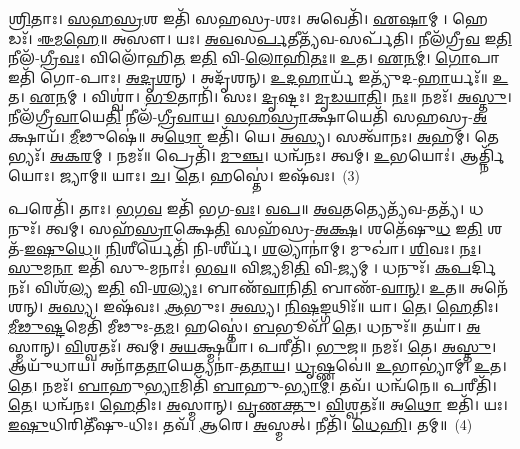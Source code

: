 \-\ul{𑌶𑍍𑌰𑌿}\-𑌤𑌾𑌃। \ul{𑌸}\-\-\ul{𑌹}\-\-\ul{𑌸𑍍𑌰}\-𑌶 𑌇𑌤𑌿᳴ 𑌸𑌹𑌸𑍍𑌰-𑌶𑌃। 𑌅𑌵𑍇𑌤𑌿᳴। \ul{𑌏}\-\-\ul{𑌷𑌾}\-𑌮𑍍। 𑌹𑍇𑌡𑌃᳴। \ul{𑌈}\-\-\ul{𑌮}\-\-\ul{𑌹𑍇}\-॥ 
𑌅𑌸𑍗। 𑌯𑌃। \ul{𑌅}\-\-\ul{𑌵}\-𑌸\-\ul{𑌰𑍍𑌪}\-𑌤𑍀𑌤𑍍𑌯᳴𑌵-𑌸𑌰𑍍𑌪᳴𑌤𑌿। 𑌨𑍀𑌲᳴𑌗𑍍𑌰𑍀\-\ul{𑌵} 𑌇\-\ul{𑌤𑌿} 𑌨𑍀𑌲᳴-\-\ul{𑌗𑍍𑌰𑍀}\-\-\ul{𑌵𑌃}\-। 𑌵𑌿𑌲𑍋᳴𑌹𑌿\-\ul{𑌤} 𑌇\-\ul{𑌤𑌿} 𑌵𑌿-\-\ul{𑌲𑍋}\-\-\ul{𑌹𑌿}\-\-\ul{𑌤𑌃}\-॥ 
\-\ul{𑌉}\-𑌤। \ul{𑌏}\-\-\ul{𑌨}\-\-\ul{𑌮𑍍}\-। \ul{𑌗𑍋}\-𑌪𑌾 𑌇𑌤𑌿᳴ 𑌗𑍋-𑌪𑌾𑌃। \ul{𑌅}\-\-\ul{𑌦𑍃}\-\-\ul{𑌶}\-𑌨𑍍। 𑌅𑌦𑍃᳴𑌶𑌨𑍍। \ul{𑌉}\-\-\ul{𑌦}\-\-\ul{𑌹𑌾}\-𑌰𑍍𑌯᳴ 𑌇𑌤𑍍𑌯𑍁᳴𑌦-\-\ul{𑌹𑌾}\-𑌰𑍍𑌯𑌃᳴॥ 
\-\ul{𑌉}\-𑌤। \ul{𑌏}\-\-\ul{𑌨}\-𑌮𑍍। 𑌵𑌿𑌶𑍍𑌵𑌾॑। \ul{𑌭𑍂}\-𑌤𑌾𑌨𑌿᳴। 𑌸𑌃। \ul{𑌦𑍃}\-𑌷𑍍𑌟𑌃। \ul{𑌮𑍃}\-\-\ul{𑌡}\-\-\ul{𑌯𑌾}\-\-\ul{𑌤𑌿}\-। \ul{𑌨𑌃}\-॥ 
𑌨𑌮𑌃᳴। \ul{𑌅}\-\-\ul{𑌸𑍍𑌤𑍁}\-। 𑌨𑍀𑌲᳴𑌗𑍍𑌰𑍀\-\ul{𑌵𑌾}\-𑌯𑍇\-\ul{𑌤𑌿} 𑌨𑍀𑌲᳴-\-\ul{𑌗𑍍𑌰𑍀}\-\-\ul{𑌵𑌾}\-\-\ul{𑌯}\-। \ul{𑌸}\-\-\ul{𑌹}\-\-\ul{𑌸𑍍𑌰𑌾}\-𑌕𑍍𑌷𑌾𑌯𑍇𑌤𑌿᳴ 𑌸𑌹𑌸𑍍𑌰-\-\ul{𑌅}\-𑌕𑍍𑌷𑌾𑌯᳴। \ul{𑌮𑍀}\-𑌢𑍁𑌷𑍇॑॥
𑌅\-\ul{𑌥𑍋} 𑌇𑌤𑌿᳴। 𑌯𑍇। \ul{𑌅}\-\-\ul{𑌸𑍍𑌯}\-। 𑌸𑌤𑍍𑌵𑌾᳴𑌨𑌃। \ul{𑌅}\-𑌹𑌮𑍍। 𑌤𑍇𑌭𑍍𑌯𑌃᳴। \ul{𑌅}\-\-\ul{𑌕}\-\-\ul{𑌰}\-𑌮𑍍। 𑌨𑌮𑌃᳴॥ 
𑌪𑍍𑌰𑍇𑌤𑌿᳴। \ul{𑌮𑍁}\-\-\ul{𑌞𑍍𑌚}\-। 𑌧𑌨𑍍𑌵᳴𑌨𑌃। 𑌤𑍍𑌵𑌮𑍍। \ul{𑌉}\-𑌭𑌯𑍋𑌃॑। 𑌆𑌰𑍍𑌤𑍍𑌨𑌿᳴𑌯𑍋𑌃। 𑌜𑍍𑌯𑌾𑌮𑍍॥ 
𑌯𑌾𑌃। \ul{𑌚}\-। \ul{𑌤𑍇}\-। 𑌹𑌸𑍍𑌤𑍇॑। 𑌇𑌷᳴𑌵𑌃।~(3)


𑌪𑌰𑍇𑌤𑌿᳴। 𑌤𑌾𑌃। \ul{𑌭}\-\-\ul{𑌗}\-\-\ul{𑌵} 𑌇𑌤𑌿᳴ 𑌭𑌗-\-\ul{𑌵𑌃}\-। \ul{𑌵}\-\-\ul{𑌪}\-॥ 
\-\ul{𑌅}\-\-\ul{𑌵}\-𑌤𑌤𑍍𑌯𑍇𑌤𑍍𑌯᳴𑌵-𑌤𑌤𑍍𑌯᳴। 𑌧𑌨𑍁𑌃᳴। 𑌤𑍍𑌵𑌮𑍍। 𑌸𑌹᳴\-\ul{𑌸𑍍𑌰𑌾}\-𑌕𑍍𑌷𑍇\-\ul{𑌤𑌿} 𑌸𑌹᳴𑌸𑍍𑌰-\-\ul{𑌅}\-\-\ul{𑌕𑍍𑌷}\-। 𑌶𑌤𑍇᳴𑌷𑍁\-\ul{𑌧} 𑌇\-\ul{𑌤𑌿} 𑌶𑌤᳴-\-\ul{𑌇}\-\-\ul{𑌷𑍁}\-\-\ul{𑌧𑍇}\-॥ 
\-\ul{𑌨𑌿}\-𑌶𑍀𑌰𑍍𑌯𑍇𑌤𑌿᳴ 𑌨𑌿-𑌶𑍀𑌰𑍍𑌯᳴। \ul{𑌶}\-𑌲𑍍𑌯𑌾𑌨𑌾॑𑌮𑍍। 𑌮𑍁𑌖𑌾॑। \ul{𑌶𑌿}\-𑌵𑌃। \ul{𑌨𑌃}\-। \ul{𑌸𑍁}\-𑌮\-\ul{𑌨𑌾} 𑌇𑌤𑌿᳴ 𑌸𑍁-𑌮𑌨𑌾𑌃॑। \ul{𑌭}\-\-\ul{𑌵}\-॥ 
𑌵𑌿\-\ul{𑌜𑍍𑌯}\-𑌮𑌿\-\ul{𑌤𑌿} 𑌵𑌿-\-\ul{𑌜𑍍𑌯}\-𑌮𑍍। 𑌧𑌨𑍁𑌃᳴। \ul{𑌕}\-\-\ul{𑌪}\-𑌰𑍍𑌦𑌿𑌨𑌃᳴। 𑌵𑌿𑌶᳴\-\ul{𑌲𑍍𑌯} 𑌇\-\ul{𑌤𑌿} 𑌵𑌿-\-\ul{𑌶}\-\-\ul{𑌲𑍍𑌯𑌃}\-। 𑌬𑌾𑌣᳴\-\ul{𑌵𑌾}\-𑌨𑌿\-\ul{𑌤𑌿} 𑌬𑌾𑌣᳴-\-\ul{𑌵𑌾}\-\-\ul{𑌨𑍍}\-। \ul{𑌉}\-𑌤॥ 
𑌅𑌨𑍇᳴𑌶𑌨𑍍। \ul{𑌅}\-\-\ul{𑌸𑍍𑌯}\-। 𑌇𑌷᳴𑌵𑌃। \ul{𑌆}\-𑌭𑍁𑌃। \ul{𑌅}\-\-\ul{𑌸𑍍𑌯}\-। \ul{𑌨𑌿}\-\-\ul{𑌷}\-𑌙𑍍𑌗𑌥𑌿𑌃᳴॥ 
𑌯𑌾। \ul{𑌤𑍇}\-। \ul{𑌹𑍇}\-𑌤𑌿𑌃। \ul{𑌮𑍀}\-\-\ul{𑌢𑍁}\-\-\ul{𑌷𑍍𑌟}\-𑌮𑍇𑌤𑌿᳴ 𑌮𑍀𑌢𑍁𑌃-\-\ul{𑌤}\-\-\ul{𑌮}\-। 𑌹𑌸𑍍𑌤𑍇॑। \ul{𑌬}\-𑌭𑍂𑌵᳴। \ul{𑌤𑍇}\-। 𑌧𑌨𑍁𑌃᳴॥ 
𑌤𑌯𑌾॑। \ul{𑌅}\-𑌸𑍍𑌮𑌾𑌨𑍍। \ul{𑌵𑌿}\-𑌶𑍍𑌵𑌤𑌃᳴। 𑌤𑍍𑌵𑌮𑍍। \ul{𑌅}\-\-\ul{𑌯}\-𑌕𑍍𑌷𑍍𑌮𑌯𑌾॑। 𑌪𑌰𑍀𑌤𑌿᳴। \ul{𑌭𑍁}\-\-\ul{𑌜}\-॥ 
𑌨𑌮𑌃᳴। \ul{𑌤𑍇}\-। \ul{𑌅}\-\-\ul{𑌸𑍍𑌤𑍁}\-। 𑌆𑌯𑍁᳴𑌧𑌾𑌯। 𑌅𑌨𑌾᳴𑌤\-\ul{𑌤𑌾}\-𑌯𑍇𑌤𑍍𑌯𑌨𑌾॑-\-\ul{𑌤}\-\-\ul{𑌤𑌾}\-\-\ul{𑌯}\-। \ul{𑌧𑍃}\-𑌷𑍍𑌣𑌵𑍇॑॥ 
\-\ul{𑌉}\-𑌭𑌾𑌭𑍍𑌯𑌾॑𑌮𑍍। \ul{𑌉}\-𑌤। \ul{𑌤𑍇}\-। 𑌨𑌮𑌃᳴। \ul{𑌬𑌾}\-𑌹𑍁\-\ul{𑌭𑍍𑌯𑌾}\-𑌮𑌿𑌤𑌿᳴ \ul{𑌬𑌾}\-𑌹𑍁-\-\ul{𑌭𑍍𑌯𑌾}\-\-\ul{𑌮𑍍}\-। 𑌤𑌵᳴। 𑌧𑌨𑍍𑌵᳴𑌨𑍇॥ 
𑌪𑌰𑍀𑌤𑌿᳴। \ul{𑌤𑍇}\-। 𑌧𑌨𑍍𑌵᳴𑌨𑌃। \ul{𑌹𑍇}\-𑌤𑌿𑌃। \ul{𑌅}\-𑌸𑍍𑌮𑌾𑌨𑍍। \ul{𑌵𑍃}\-\-\ul{𑌣}\-\-\ul{𑌕𑍍𑌤𑍁}\-। \ul{𑌵𑌿}\-𑌶𑍍𑌵𑌤𑌃᳴॥
 𑌅\-\ul{𑌥𑍋} 𑌇𑌤𑌿᳴। 𑌯𑌃। \ul{𑌇}\-\-\ul{𑌷𑍁}\-𑌧𑌿𑌰𑌿𑌤𑍀᳴𑌷𑍁-𑌧𑌿𑌃। 𑌤𑌵᳴। \ul{𑌆}\-𑌰𑍇। \ul{𑌅}\-𑌸𑍍𑌮𑌤𑍍। 𑌨𑍀𑌤𑌿᳴। \ul{𑌧𑍇}\-\-\ul{𑌹𑌿}\-। 𑌤𑌮𑍍॥~(4)


